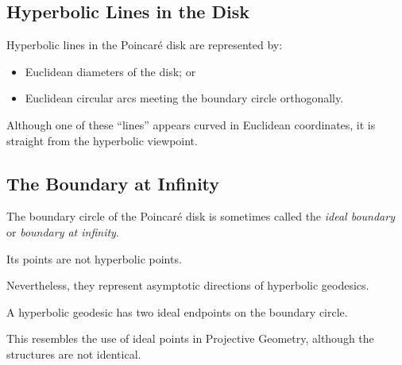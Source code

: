 \subsection{Hyperbolic Lines in the Disk}
\label{subsec:hyperbolic-lines-disk}

Hyperbolic lines in the Poincar\'e disk are represented by:

\begin{itemize}
    \item Euclidean diameters of the disk; or
    \item Euclidean circular arcs meeting the boundary circle
    orthogonally.
\end{itemize}

\begin{centereddiagram}
\end{centereddiagram}

Although one of these ``lines'' appears curved in Euclidean coordinates, it
is straight from the hyperbolic viewpoint.

\subsection{The Boundary at Infinity}
\label{subsec:hyperbolic-boundary-infinity}

The boundary circle of the Poincar\'e disk is sometimes called the
\emph{ideal boundary} or \emph{boundary at infinity}.

Its points are not hyperbolic points.

Nevertheless, they represent asymptotic directions of hyperbolic geodesics.

A hyperbolic geodesic has two ideal endpoints on the boundary circle.

This resembles the use of ideal points in Projective Geometry, although the
structures are not identical.


